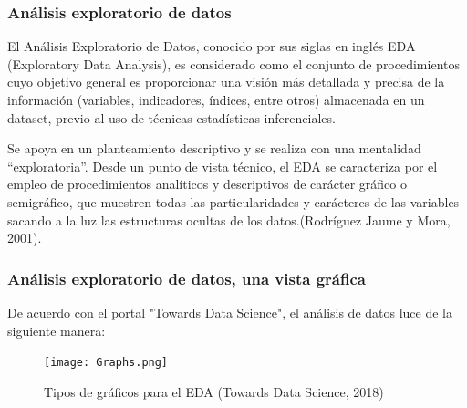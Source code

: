 \begin{frame}[fragile] 
    \frametitle{Análisis exploratorio de datos}
    \begin{center}
        El Análisis Exploratorio de Datos, conocido por sus siglas en inglés EDA (Exploratory Data Analysis), es considerado como el conjunto de procedimientos cuyo objetivo general es proporcionar una visión más detallada y precisa de la información (variables, indicadores, índices, entre otros) almacenada en un dataset, previo al uso de técnicas estadísticas inferenciales. \newline
    \end{center}

    \begin{center}
        Se apoya en un planteamiento descriptivo y se realiza  con una mentalidad “exploratoria”. Desde un punto de vista técnico, el EDA se caracteriza por el empleo de procedimientos analíticos y descriptivos de carácter gráfico o semigráfico, que muestren todas las particularidades y carácteres de las variables sacando a la luz las estructuras ocultas de los datos.(Rodríguez Jaume y Mora, 2001).
    \end{center}
\end{frame}


\begin{frame}[fragile] 
    \frametitle{Análisis exploratorio de datos, una vista gráfica}
    
 De acuerdo con el portal "Towards Data Science", el análisis de datos luce de la siguiente manera: \newline
 
     \begin{figure}[H]
        \centering
            \texttt{[image: Graphs.png]}
        \caption{Tipos de gráficos para el EDA (Towards Data Science, 2018)}
    \end{figure}

\end{frame}


